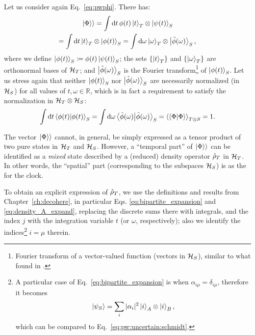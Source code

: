 Let us consider again Eq.~\eqref{eq:pwphi}. There has:
\begin{multline}\label{eq:pw:uncertain:schmidt}
  \left.\left| \Phi \right\rangle\right\rangle =
    \int \dd{t} \phi(t) \ket{t}_T \otimes \ket{\psi(t)}_S
    \\
    = \int \dd{t} \ket{t}_T \otimes \ket{\phi(t)}_S
    = \int \dd\omega \ket{\omega}_T \otimes \ket{\tilde{\phi}(\omega)}_S
    \text{,}
\end{multline}
where we define $\ket{\phi(t)}_S \coloneqq \phi(t)\ket{\psi(t)}_S$;
%
%
the sets $\left\{\ket{t}_T\right\}$ and $\left\{\ket{\omega}_T\right\}$
are
orthonormal bases of $\mathcal{H}_T$;
and
$\ket{\tilde{\phi}(\omega)}_S$ is the Fourier transform\footnote{
  Fourier transform of a
  vector-valued function
  (vectors in $\mathcal{H}_S$),
  similar to what found in \cite{Maccone:Pauli}.
}
of $\ket{\phi(t)}_S$. Let us stress again that
neither $\ket{\phi(t)}_S$ nor $\ket{\tilde{\phi}(\omega)}_S$
are necessarily normalized (in $\mathcal{H}_S$)
for all values of $t, \omega \in \mathbb{R}$,
which is in fact a requirement
to satisfy the normalization in $\mathcal{H}_T \otimes \mathcal{H}_S$:
\[
  \int \dd{t} \braket{\phi(t)}_S =
    \int \dd{\omega} \braket{\tilde{\phi}(\omega)}_S =
    \left\langle\left\langle \Phi \middle| \Phi \right\rangle\right\rangle_{T \otimes S} =
    1
    \text{.}
\]

The vector $\left.\left| \Phi \right\rangle\right\rangle$
cannot,
in general, be simply expressed as a tensor product of two pure states
in $\mathcal{H}_T$ and $\mathcal{H}_S$.
However,
a ``temporal part'' of $\left.\left| \Phi \right\rangle\right\rangle$
can be identified as a \emph{mixed} state described
by a (reduced) density operator $\hat{\rho}_T$ in $\mathcal{H}_T$.
In other words, the ``spatial'' part (corresponding to the subspaces $\mathcal{H}_S$)
is  as the  for the clock.

To obtain an explicit expression of $\hat{\rho}_T$,
we use the definitions and results from Chapter~\ref{ch:decohere},
in particular Eqs. \eqref{eq:bipartite_expansion} and \eqref{eq:density_A_expand},
replacing the discrete sums there with integrals,
and the index $j$ with the integration variable $t$ (or $\omega$, respectively);
also we identify the indices\footnote{
  A particular case of Eq.~\eqref{eq:bipartite_expansion} is when $\alpha_{i\mu} = \delta_{i\mu}$,
  therefore it becomes
  $$\ket{\psi_S} = \sum_{i} |\alpha_{i}|^{2} \ket{i}_A \otimes \ket{i}_B \text{,}$$
  which can be compared to Eq.~\eqref{eq:pw:uncertain:schmidt}.
}
$i = \mu$ therein.

